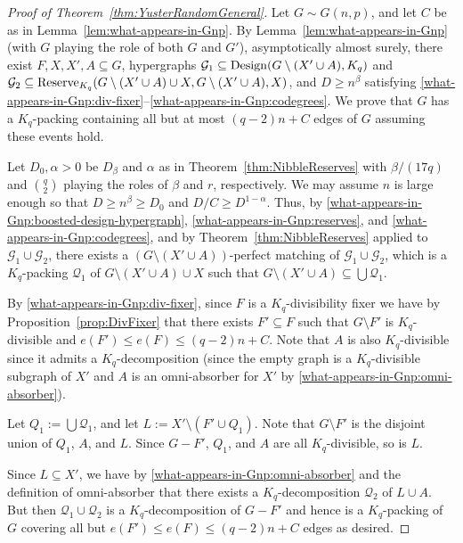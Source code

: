 \documentclass[11pt]{article}
\def\COMMENT#1{}
\numberwithin{equation}{section}
\newcommand{\mc}[1]{\mathcal{#1}}
\newcounter{i}
\theoremstyle{plain}
\theoremstyle{plain} %
\theoremstyle{definition}
\newcommand{\cG}{\mathcal{G}}
\begin{document}
\begin{proof}[Proof of Theorem~\ref{thm:YusterRandomGeneral}]
  Let $G \sim G(n,p)$, and let $C$ be as in Lemma~\ref{lem:what-appears-in-Gnp}.  By Lemma~\ref{lem:what-appears-in-Gnp} (with $G$ playing the role of both $G$ and $G'$), asymptotically almost surely, there exist $F, X, X', A \subseteq G$, hypergraphs $\cG_1 \subseteq {\rm Design}(G \setminus (X' \cup A), K_q)$ and $\cG_2 \subseteq {\rm Reserve}_{K_q}(G\setminus (X' \cup A) \cup X, G \setminus (X' \cup A), X)$, and $D \geq n^\beta$ satisfying \ref{what-appears-in-Gnp:div-fixer}--\ref{what-appears-in-Gnp:codegrees}.  We prove that $G$ has a $K_q$-packing containing all but at most $(q - 2)n + C$ edges of $G$ assuming these events hold.

  Let $D_0, \alpha > 0$ be $D_\beta$ and $\alpha$ as in Theorem~\ref{thm:NibbleReserves} with $\beta / (17q)$ and $\binom{q}{2}$ playing the roles of $\beta$ and $r$, respectively.  We may assume $n$ is large enough so that $D \geq n^\beta \geq D_0$ and $D / C \geq D^{1 - \alpha}$.  Thus, by \ref{what-appears-in-Gnp:boosted-design-hypergraph}, \ref{what-appears-in-Gnp:reserves}, and \ref{what-appears-in-Gnp:codegrees}, and by Theorem~\ref{thm:NibbleReserves} applied to $\cG_1 \cup \cG_2$, there exists a $(G\setminus (X'\cup A))$-perfect matching of $\mc{G}_1\cup \mc{G}_2$, which is a $K_q$-packing $\mathcal{Q}_1$ of $G \setminus (X' \cup A) \cup X$ such that $G \setminus (X' \cup A) \subseteq \bigcup \mc{Q}_1$. 

By \ref{what-appears-in-Gnp:div-fixer}, since $F$ is a $K_q$-divisibility fixer we have by Proposition~\ref{prop:DivFixer} that there exists $F'\subseteq F$ such that $G\setminus F'$ is $K_q$-divisible and $e(F') \leq e(F) \leq (q - 2)n + C$.  Note that $A$ is also $K_q$-divisible since it admits a $K_q$-decomposition (since the empty graph is a $K_q$-divisible subgraph of $X'$ and $A$ is an omni-absorber for $X'$ by \ref{what-appears-in-Gnp:omni-absorber}).

Let $Q_1:= \bigcup \mc{Q}_1$, and let $L := X'\setminus (F' \cup  Q_1)$.  Note that $G \setminus F'$ is the disjoint union of $Q_1$, $A$, and $L$\COMMENT{$A$ and $X'$ are edge-disjoint by the definition of omni-absorber}.  Since $G-F'$, $Q_1$, and $A$ are all $K_q$-divisible, so is $L$.

Since $L\subseteq X'$, we have by \ref{what-appears-in-Gnp:omni-absorber} and the definition of omni-absorber that there exists a $K_q$-decomposition $\mathcal{Q}_2$ of $L\cup A$. But then $\mathcal{Q}_1\cup \mathcal{Q}_2$ is a $K_q$-decomposition of $G-F'$ and hence is a $K_q$-packing of $G$ covering all but $e(F') \le e(F) \le (q-2)n+C$ edges as desired.
\end{proof}
\end{document}
